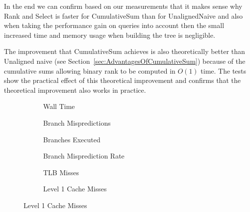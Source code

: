 In the end we can confirm based on our measurements that it makes sense why Rank and Select is faster for CumulativeSum than for UnalignedNaive and also when taking the performance gain on queries into account then the small increased time and memory usage when building the tree is negligible.

The improvement that CumulativeSum achieves is also theoretically better than Unaligned naive (see Section~\ref{sec:AdvantagesOfCumulativeSum}) because of the cumulative sums allowing binary rank to be computed in $O(1)$ time.
The tests show the practical effect of this theoretical improvement and confirms that the theoretical improvement also works in practice.



\begin{figure}\tiny

\begin{subfigure}{0.30\textwidth}
	
	\caption{Wall Time}
	\label{fig:CumulativeSumRankWalltime}
\end{subfigure}
\hfill
\begin{subfigure}{0.30\textwidth}
	
	\caption{Branch Mispredictions}
	\label{fig:CumulativeSumRankBranchMiss}
\end{subfigure}
\hfill
\begin{subfigure}{0.30\textwidth}
	
	\caption{Branches Executed}
	\label{fig:CumulativeSumRankBranchExe}
\end{subfigure}


\begin{subfigure}{0.30\textwidth}
	
	\caption{Branch Misprediction Rate}
	\label{fig:CumulativeSumRankBranchMissRate}
\end{subfigure}
\hfill
\begin{subfigure}{0.30\textwidth}
	
	\caption{TLB Misses}
	\label{fig:CumulativeSumRankTLBMiss}
\end{subfigure}
\hfill
\begin{subfigure}{0.30\textwidth}
	
	\caption{Level 1 Cache Misses}
	\label{fig:CumulativeSumRankL1CM}
\end{subfigure}


\end{figure}
